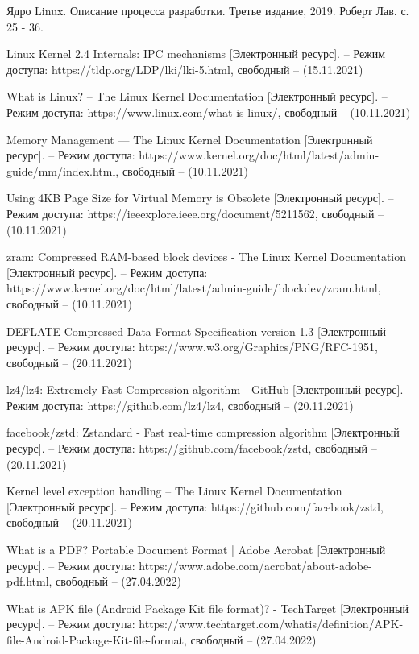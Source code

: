 \begin{thebibliography}{}
	Ядро Linux. Описание процесса разработки. Третье издание, 2019. Роберт Лав. с. 25 - 36.
	
	Linux Kernel 2.4 Internals: IPC mechanisms [Электронный ресурс]. – Режим доступа: https://tldp.org/LDP/lki/lki-5.html, свободный – (15.11.2021)
	 
	 What is Linux? -- The Linux Kernel Documentation [Электронный ресурс]. – Режим доступа: https://www.linux.com/what-is-linux/, свободный – (10.11.2021)
	
	Memory Management — The Linux Kernel Documentation [Электронный ресурс]. – Режим доступа: https://www.kernel.org/doc/html/latest/admin-guide/mm/index.html, свободный – (10.11.2021)
	
	Using 4KB Page Size for Virtual Memory is Obsolete [Электронный ресурс]. – Режим доступа: https://ieeexplore.ieee.org/document/5211562, свободный – (10.11.2021)
	
	zram: Compressed RAM-based block devices - The Linux Kernel Documentation [Электронный ресурс]. – Режим доступа: https://www.kernel.org/doc/html/latest/admin-guide/blockdev/zram.html, свободный – (10.11.2021)
	
	DEFLATE Compressed Data Format Specification version 1.3 [Электронный ресурс]. – Режим доступа: https://www.w3.org/Graphics/PNG/RFC-1951, свободный – (20.11.2021)
	
	lz4/lz4: Extremely Fast Compression algorithm - GitHub [Электронный ресурс]. – Режим доступа: https://github.com/lz4/lz4, свободный – (20.11.2021)
	
	facebook/zstd: Zstandard - Fast real-time compression algorithm [Электронный ресурс]. – Режим доступа: https://github.com/facebook/zstd, свободный – (20.11.2021)
	
	Kernel level exception handling -- The Linux Kernel Documentation [Электронный ресурс]. – Режим доступа: https://github.com/facebook/zstd, свободный – (20.11.2021)
	
	What is a PDF? Portable Document Format | Adobe Acrobat [Электронный ресурс]. – Режим доступа: 	https://www.adobe.com/acrobat/about-adobe-pdf.html, свободный – (27.04.2022)
	
	What is APK file (Android Package Kit file format)? - TechTarget [Электронный ресурс]. – Режим доступа: 	https://www.techtarget.com/whatis/definition/APK-file-Android-Package-Kit-file-format, свободный – (27.04.2022)
	

\end{thebibliography}
